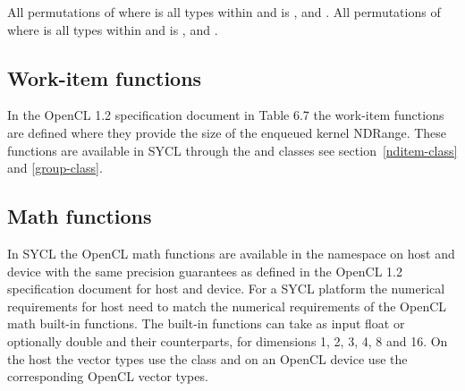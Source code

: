 {
}

{
}
{
  All permutations of  where  is all types within  and  is ,  and .
}
{
    All permutations of  where  is all types within  and  is ,  and .
}
\completeTable

\subsection{Work-item functions}

In the OpenCL 1.2 specification document\cite[ch. 6.12.1]{opencl12} in Table 6.7
the work-item functions are defined where they provide the size of the enqueued
kernel NDRange. These functions are available in SYCL through the
 and  classes see
section~\ref{nditem-class} and \ref{group-class}.

\subsection{Math functions}

In SYCL the OpenCL math functions are available in the namespace
 on host and device with the same precision
guarantees as defined in the OpenCL 1.2 specification document
\cite[ch. 7]{opencl12} for host and device. For a SYCL platform the
numerical requirements for host need to match the numerical
requirements of the OpenCL math built-in functions. The built-in
functions can take as input float or optionally double and their
 counterparts, for dimensions 1, 2, 3, 4, 8 and 16. On
the host the vector types use the  class and on an
OpenCL device use the corresponding OpenCL vector types.

